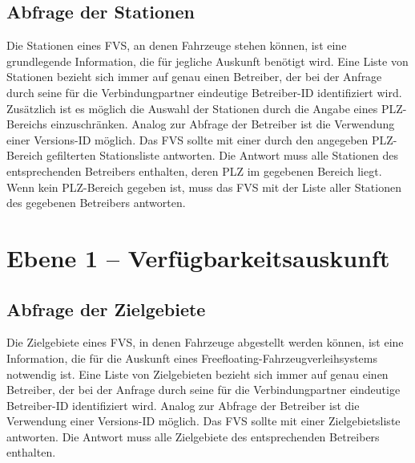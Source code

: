 \subsection{Abfrage der Stationen}
Die Stationen eines FVS, an denen Fahrzeuge stehen können, ist eine grundlegende Information, die für jegliche Auskunft benötigt wird. Eine Liste von Stationen bezieht sich immer auf genau einen Betreiber, der bei der Anfrage durch seine für die Verbindungpartner eindeutige Betreiber-ID identifiziert wird. Zusätzlich ist es möglich die Auswahl der Stationen durch die Angabe eines PLZ-Bereichs einzuschränken. Analog zur Abfrage der Betreiber ist die Verwendung einer Versions-ID möglich. Das FVS sollte mit einer durch den angegeben PLZ-Bereich gefilterten Stationsliste antworten. Die Antwort muss alle Stationen des entsprechenden Betreibers enthalten, deren PLZ im gegebenen Bereich liegt. Wenn kein PLZ-Bereich gegeben ist, muss das FVS mit der Liste aller Stationen des gegebenen Betreibers antworten.

\section{Ebene 1 -- Verfügbarkeitsauskunft}

\subsection{Abfrage der Zielgebiete}
Die Zielgebiete eines FVS, in denen Fahrzeuge abgestellt werden können, ist eine Information, die für die Auskunft eines Freefloating-Fahrzeugverleihsystems notwendig ist. Eine Liste von Zielgebieten bezieht sich immer auf genau einen Betreiber, der bei der Anfrage durch seine für die Verbindungpartner eindeutige Betreiber-ID identifiziert wird. Analog zur Abfrage der Betreiber ist die Verwendung einer Versions-ID möglich. Das FVS sollte mit einer Zielgebietsliste antworten. Die Antwort muss alle Zielgebiete des entsprechenden Betreibers enthalten.

